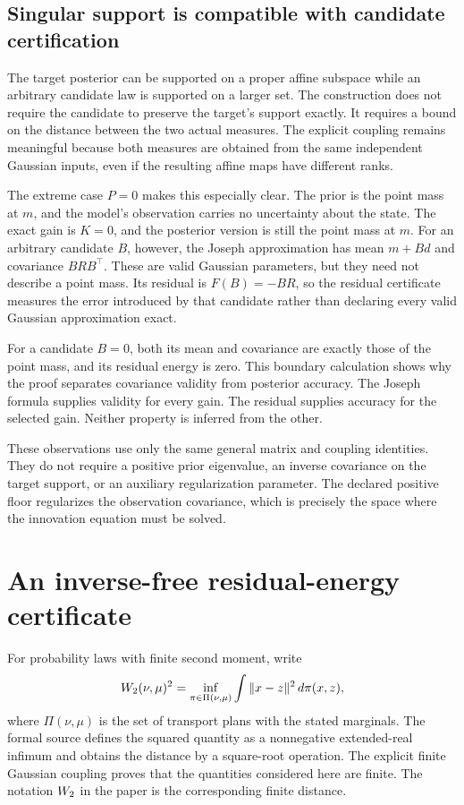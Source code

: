 \subsection{Singular support is compatible with candidate certification}

The target posterior can be supported on a proper affine subspace while an arbitrary candidate law is supported on a larger set. The construction does not require the candidate to preserve the target's support exactly. It requires a bound on the distance between the two actual measures. The explicit coupling remains meaningful because both measures are obtained from the same independent Gaussian inputs, even if the resulting affine maps have different ranks.

The extreme case $P=0$ makes this especially clear. The prior is the point mass at $m$, and the model's observation carries no uncertainty about the state. The exact gain is $K=0$, and the posterior version is still the point mass at $m$. For an arbitrary candidate $B$, however, the Joseph approximation has mean $m+Bd$ and covariance $BRB^\top$. These are valid Gaussian parameters, but they need not describe a point mass. Its residual is $F(B)=-BR$, so the residual certificate measures the error introduced by that candidate rather than declaring every valid Gaussian approximation exact.

For a candidate $B=0$, both its mean and covariance are exactly those of the point mass, and its residual energy is zero. This boundary calculation shows why the proof separates covariance validity from posterior accuracy. The Joseph formula supplies validity for every gain. The residual supplies accuracy for the selected gain. Neither property is inferred from the other.

These observations use only the same general matrix and coupling identities. They do not require a positive prior eigenvalue, an inverse covariance on the target support, or an auxiliary regularization parameter. The declared positive floor regularizes the observation covariance, which is precisely the space where the innovation equation must be solved.

\section{An inverse-free residual-energy certificate}
\label{sec:foundation-energy-certificate}

For probability laws with finite second moment, write
\[
 W_2(\nu,\mu)^2
 =\inf_{\pi\in\Pi(\nu,\mu)}\int\|x-z\|^2\,d\pi(x,z),
\]
where $\Pi(\nu,\mu)$ is the set of transport plans with the stated marginals. The formal source defines the squared quantity as a nonnegative extended-real infimum and obtains the distance by a square-root operation. The explicit finite Gaussian coupling proves that the quantities considered here are finite. The notation $W_2$ in the paper is the corresponding finite distance.

